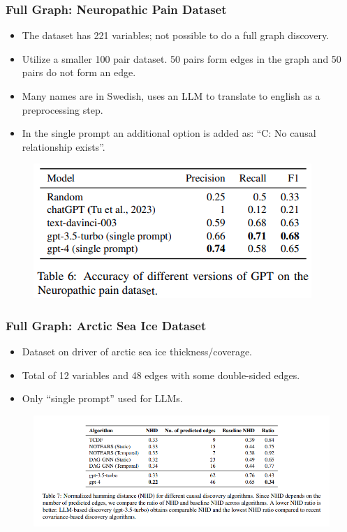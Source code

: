 \documentclass{beamer}
\begin{document}
\begin{frame}
	\frametitle{Full Graph: Neuropathic Pain Dataset}
	\begin{itemize}
		\item The dataset has 221 variables; not possible to do a full graph discovery.
		\item Utilize a smaller 100 pair dataset. 50 pairs form edges in the graph and 50 pairs do not form an edge.
		\item Many names are in Swedish, uses an LLM to translate to english as a preprocessing step.
		\item In the single prompt an additional option is added as: ``C: No causal relationship exists''.
	\end{itemize}
	\begin{figure}
		\includegraphics[scale=0.4]{imgs/table6.png}
	\end{figure}
\end{frame}

\begin{frame}
	\frametitle{Full Graph: Arctic Sea Ice Dataset}
	\begin{itemize}
		\item Dataset on driver of arctic sea ice thickness/coverage.
		\item Total of 12 variables and 48 edges with some double-sided edges.
		\item Only ``single prompt'' used for LLMs.
	\end{itemize}
	\begin{figure}
		\includegraphics[scale=0.4]{imgs/table7.png}
	\end{figure}
\end{frame}
\end{document}

